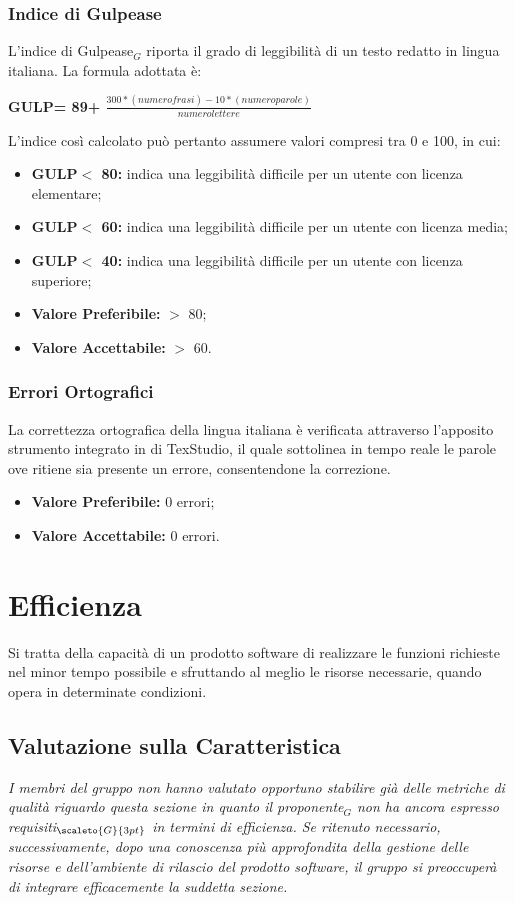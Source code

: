 \subsubsection{Indice di Gulpease} \label{QualitàDelProdottoUsabilitàMetricheIndiceDiGulpease}
L’indice di Gulpease$_G$ riporta il grado di leggibilità di un testo redatto in lingua italiana.
La formula adottata è:
\begin{center}
	\textbf{GULP= 89+ $\frac{300*(numero frasi)-10*(numero parole)}{numero lettere}$}
\end{center}
L'indice così calcolato può pertanto assumere valori compresi tra 0 e 100, in cui:
\begin{itemize}
	\item \textbf{GULP$<$ 80:} indica una leggibilità difficile per un utente con licenza elementare;
	\item \textbf{GULP$<$ 60:} indica una leggibilità difficile per un utente con licenza media;
	\item \textbf{GULP$<$ 40:} indica una leggibilità difficile per un utente con licenza superiore;
	\item \textbf{Valore Preferibile:} $>$ 80;
	\item \textbf{Valore  Accettabile:} $>$ 60.
\end{itemize}
\subsubsection{Errori Ortografici} \label{QualitàDelProdottoUsabilitàMetricheErroriOrtografici}
La correttezza ortografica della lingua italiana è verificata attraverso l’apposito strumento integrato in di TexStudio, il quale sottolinea in tempo reale le parole ove ritiene sia presente un errore, consentendone la correzione.
\begin{itemize}
	\item \textbf{Valore Preferibile:} 0 errori;
	\item \textbf{Valore  Accettabile:} 0 errori.
\end{itemize}

\section{Efficienza} \label{QualitàDelProdottoEfficienza}
Si tratta della capacità di un prodotto software di realizzare le funzioni richieste nel minor tempo possibile e sfruttando al meglio le risorse necessarie, quando opera in determinate condizioni.
\subsection{Valutazione sulla Caratteristica} \label{QualitàDelProdottoEfficienzaValutazioneSullaCaratteristica}
\textit{I membri del gruppo non hanno valutato opportuno stabilire già delle metriche di qualità riguardo questa sezione in quanto il proponente$_G$ non ha ancora espresso requisiti$_{\scaleto{G}{3pt}}$ in termini di efficienza. Se ritenuto necessario, successivamente, dopo una conoscenza più approfondita della gestione delle risorse e dell’ambiente di rilascio del prodotto software, il gruppo si preoccuperà di integrare efficacemente la suddetta sezione.}

